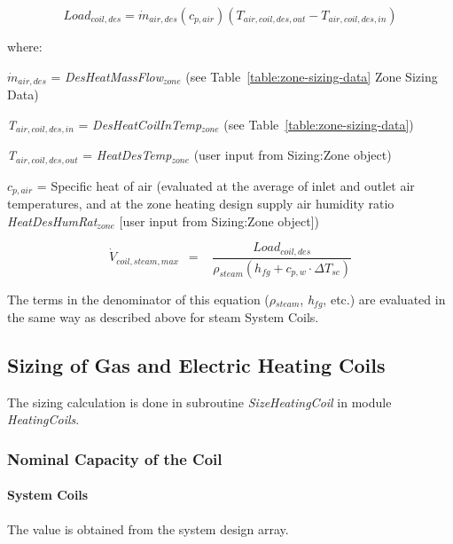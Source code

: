 \begin{equation}
Loa{d_{coil,des}} = {\dot m_{air,des}}({c_{p,air}})({T_{air,coil,des,out}} - {T_{air,coil,des,in}})
\end{equation}

where:

\({\dot m_{air,des}}\) = \emph{DesHeatMassFlow\(_{zone}\)} (see Table~\ref{table:zone-sizing-data} Zone Sizing Data)

\emph{T\(_{air,coil,des,in}\)} = \emph{DesHeatCoilInTemp\(_{zone}\)} (see Table~\ref{table:zone-sizing-data})

\emph{T\(_{air,coil,des,out}\)} = \emph{HeatDesTemp\(_{zone}\)} (user input from Sizing:Zone object)

\({c_{p,air}}\) = Specific heat of air (evaluated at the average of inlet and outlet air temperatures, and at the zone heating design supply air humidity ratio \emph{HeatDesHumRat\(_{zone}\)} {[}user input from Sizing:Zone object{]})

\begin{equation}
{\dot V_{coil,steam,max}}\,\,\, = \,\,\,\,\,\frac{{Loa{d_{coil,des}}}}{{{\rho_{steam}}\left( {{h_{fg}} + {c_{p,w}}\cdot \Delta {T_{sc}}} \right)}}
\end{equation}

The terms in the denominator of this equation (\emph{\(\rho\)\(_{steam}\)}, \emph{h\(_{fg}\)}, etc.) are evaluated in the same way as described above for steam System Coils.

\subsection{Sizing of Gas and Electric Heating Coils}\label{sizing-of-gas-and-electric-heating-coils}

The sizing calculation is done in subroutine \emph{SizeHeatingCoil} in module \emph{HeatingCoils}.

\subsubsection{Nominal Capacity of the Coil}\label{nominal-capacity-of-the-coil}

\paragraph{System Coils}\label{system-coils-3}

The value is obtained from the system design array.

